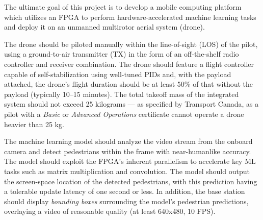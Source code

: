 The ultimate goal of this project is to develop a mobile computing platform which utilizes an FPGA to perform hardware-accelerated machine learning tasks and deploy it on an unmanned multirotor aerial system (drone). 

The drone should be piloted manually within the line-of-sight (LOS) of the pilot, using a ground-to-air transmitter (TX) in the form of an off-the-shelf radio controller and receiver combination. The drone should feature a flight controller capable of self-stabilization using well-tuned PIDs and,
with the payload attached, the drone's flight duration should be at least 50\% of that without the payload (typically 10--15 minutes).
The total takeoff mass of the integrated system should not exceed 25 kilograms --- as specified by Transport Canada, as a pilot with a \textit{Basic} or \textit{Advanced Operations} certificate cannot operate a drone heavier than 25 kg\cite{trans-canada}.

The machine learning model should analyze the video stream from the onboard camera and detect pedestrians within the frame with near-humanlike accuracy. The model should exploit the FPGA's inherent parallelism to accelerate key ML tasks such as matrix multiplication and convolution. The model should output the screen-space location of the detected pedestrians, with this prediction having a tolerable update latency of one second or less. In addition, the base station should display \textit{bounding boxes} surrounding the model's pedestrian predictions, overlaying a video of reasonable quality (at least 640x480, 10 FPS).
